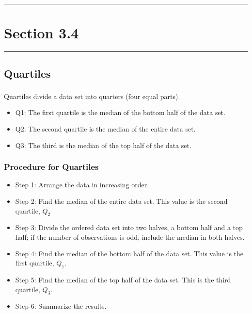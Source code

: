 \documentclass[12pt]{article}
\begin{document}
    \noindent\rule{\textwidth}{0.4pt}
    \section*{Section 3.4}
    \noindent\rule{\textwidth}{0.4pt}
        \subsection*{Quartiles}
            \subsubsection*{}
                Quartiles divide a data set into quarters (four equal parts).
                \begin{itemize}
                    \item{Q1:} The first quartile is the median of the bottom half of the data set.
                    \item{Q2:} The second quartile is the median of the entire data set.
                    \item{Q3:} The third is the median of the top half of the data set.
                \end{itemize}
            \subsubsection*{Procedure for Quartiles}
                \begin{itemize}
                    \item{Step 1:} Arrange the data in increasing order.
                    \item{Step 2:} Find the median of the entire data set. This value is the second
                    quartile, \(Q_2\)
                    \item{Step 3:} Divide the ordered data set into two halves, a bottom half and a
                    top half; if the number of observations is odd, include the median in both halves.
                    \item{Step 4:} Find the median of the bottom half of the data set. This value is
                    the first quartile, \(Q_1\).
                    \item{Step 5:} Find the median of the top half of the data set. This is the third
                    quartile, \(Q_3\).
                    \item{Step 6:} Summarize the results.
                \end{itemize}
\end{document}
